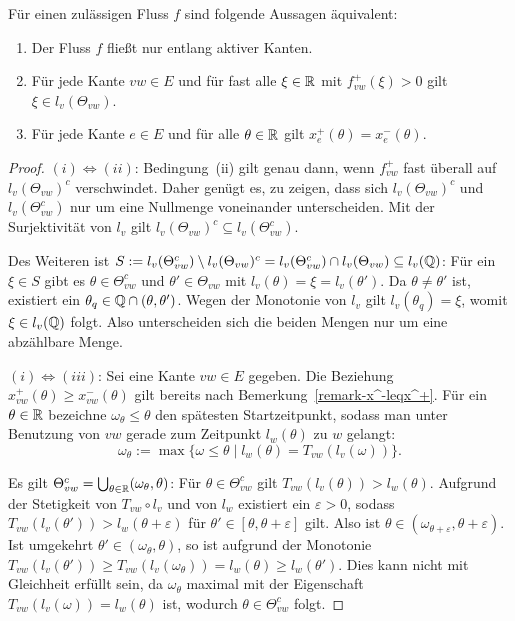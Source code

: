 \begin{lemma}\label{lemma-only-active-edges}
	Für einen zulässigen Fluss $f$ sind folgende Aussagen äquivalent:
	\begin{enumerate}[label=(\roman*)]
		\item Der Fluss $f$ fließt nur entlang aktiver Kanten.
		\item Für jede Kante $vw\in E$ und für fast alle $\xi\in\mathbb{R}$ mit	$f_{vw}^+(\xi)>0$ gilt $\xi \in l_v(\Theta_{vw})$.
		\item Für jede Kante $e\in E$ und für alle $\theta\in\mathbb{R}$ gilt $x_e^+(\theta) = x_e^-(\theta)$.
	\end{enumerate}
\end{lemma}
\begin{proof}
	$(i) \Leftrightarrow (ii)$: Bedingung~(ii) gilt genau dann, wenn $f_{vw}^+$ fast überall auf $l_v(\Theta_{vw})^c$ verschwindet.
	Daher genügt es, zu zeigen, dass sich $l_v(\Theta_{vw})^c$ und $l_v(\Theta_{vw}^c)$ nur um eine Nullmenge voneinander unterscheiden.
	Mit der Surjektivität von $l_v$ gilt $l_v(\Theta_{vw})^c\subseteq l_v(\Theta_{vw}^c)$.
	
	Des Weiteren ist $S:=l_v(\Theta_{vw}^c)\setminus l_v(\Theta_{vw})^c = l_v(\Theta_{vw}^c)\cap l_v(\Theta_{vw})\subseteq l_v(\mathbb{Q})$:
	Für ein $\xi\in S$ gibt es $\theta\in\Theta_{vw}^c$ und $\theta'\in\Theta_{vw}$ mit $l_v(\theta)=\xi=l_v(\theta')$.
	Da $\theta\neq\theta'$ ist, existiert ein $\theta_q\in\mathbb{Q}\cap(\theta,\theta')$.
	Wegen der Monotonie von $l_v$ gilt $l_v(\theta_q)=\xi$, womit $\xi\in l_v(\mathbb{Q})$ folgt.
	Also unterscheiden sich die beiden Mengen nur um eine abzählbare Menge.
	
	$(i)\Leftrightarrow (iii)$: Sei eine Kante $vw\in E$ gegeben.
	Die Beziehung $x_{vw}^+(\theta) \geq x_{vw}^-(\theta)$ gilt bereits nach Bemerkung~\ref{remark-x^-leqx^+}.
	Für ein $\theta\in\mathbb{R}$ bezeichne $\omega_\theta\leq \theta$ den spätesten Startzeitpunkt, sodass man unter Benutzung von $vw$ gerade zum Zeitpunkt $l_w(\theta)$ zu $w$ gelangt:
	$$\omega_\theta:=\max\{ \omega\leq\theta \mid l_w(\theta) = T_{vw}(l_v(\omega)) \}.$$
	
	Es gilt $\Theta_{vw}^c = \bigcup_{\theta\in\mathbb{R}} (\omega_\theta, \theta)$:
	Für $\theta\in\Theta_{vw}^c$ gilt $T_{vw}(l_v(\theta)) > l_w(\theta)$.
	Aufgrund der Stetigkeit von $T_{vw}\circ l_v$ und von $l_w$ existiert ein $\varepsilon>0$, sodass $T_{vw}(l_v(\theta')) > l_w(\theta+\varepsilon)$ für $\theta'\in[\theta,\theta+\varepsilon]$ gilt.
	Also ist $\theta\in(\omega_{\theta+\varepsilon}, \theta+\varepsilon)$.
	Ist umgekehrt $\theta'\in (\omega_\theta,\theta)$, so ist aufgrund der Monotonie $T_{vw}(l_v(\theta'))\geq T_{vw}(l_v(\omega_\theta)) = l_w(\theta)\geq l_w(\theta')$.
	Dies kann nicht mit Gleichheit erfüllt sein, da $\omega_\theta$ maximal mit der Eigenschaft $T_{vw}(l_v(\omega)) = l_w(\theta)$ ist, wodurch $\theta\in\Theta_{vw}^c$ folgt.
	

\end{proof}
